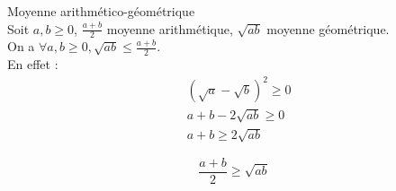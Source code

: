 \begin{exemple}
    Moyenne arithmético-géométrique
    \\
    Soit $a, b \geq 0$, $\frac{a + b}{2}$ moyenne arithmétique, $\sqrt{ab}$ moyenne géométrique. 
    \\
    On a $\forall a, b \geq 0, \sqrt{ab} \leq \frac{a + b}{2}$.
    \\
    En effet : 
    \begin{align*}
    &(\sqrt{a} - \sqrt{b})^2 \geq 0 \\
    &a + b - 2\sqrt{ab} \geq 0 \\
    &a + b \geq 2\sqrt{ab}
    \end{align*}

    \begin{equation}\label{moyennes}
        \frac{a + b}{2} \geq \sqrt{ab}
    \end{equation}
    

\end{exemple}
